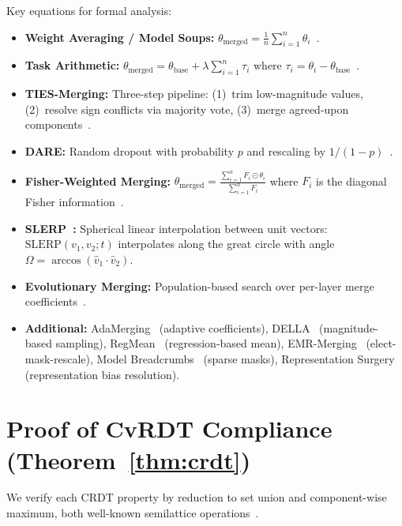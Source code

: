 \documentclass[10pt,letterpaper]{article}
\begin{document}
Key equations for formal analysis:
\begin{itemize}[leftmargin=*]\emergencystretch=2em
\item \textbf{Weight Averaging / Model Soups:} $\theta_{\mathrm{merged}} = \frac{1}{n}\sum_{i=1}^{n} \theta_i$~\cite{wortsman2022model}.
\item \textbf{Task Arithmetic:} $\theta_{\mathrm{merged}} = \theta_{\mathrm{base}} + \lambda \sum_{i=1}^{n} \tau_i$ where $\tau_i = \theta_i - \theta_{\mathrm{base}}$~\cite{ilharco2023editing}.
\item \textbf{TIES-Merging:} Three-step pipeline: (1)~trim low-magnitude values, (2)~resolve sign conflicts via majority vote, (3)~merge agreed-upon components~\cite{yadav2023ties}.
\item \textbf{DARE:} Random dropout with probability $p$ and rescaling by $1/(1-p)$~\cite{yu2024dare}.
\item \textbf{Fisher-Weighted Merging:} $\theta_{\mathrm{merged}} = \frac{\sum_{i=1}^{n} F_i \odot \theta_i}{\sum_{i=1}^{n} F_i}$ where $F_i$ is the diagonal Fisher information~\cite{matena2022merging}.
\item \textbf{SLERP~\cite{shoemake1985animating}:} Spherical linear interpolation between unit vectors: $\mathrm{SLERP}(v_1, v_2; t)$ interpolates along the great circle with angle $\Omega = \arccos(\hat{v}_1 \cdot \hat{v}_2)$.
\item \textbf{Evolutionary Merging:} Population-based search over per-layer merge coefficients~\cite{akiba2025evolutionary}.
\item \textbf{Additional:} AdaMerging~\cite{yang2024adamerging} (adaptive coefficients), DELLA~\cite{deep2024della} (magnitude-based sampling), RegMean~\cite{jin2023regmean} (regression-based mean), EMR-Merging~\cite{huang2024emr} (elect-mask-rescale), Model Breadcrumbs~\cite{davari2024breadcrumbs} (sparse masks), Representation Surgery~\cite{yang2024surgery} (representation bias resolution).
\end{itemize}

\section{Proof of CvRDT Compliance (Theorem~\ref{thm:crdt})}\label{app:crdt_proof}

We verify each CRDT property by reduction to set union and component-wise maximum, both well-known semilattice operations~\cite{shapiro2011comprehensive}.
\end{document}
